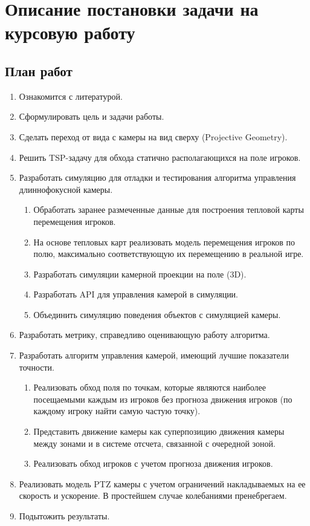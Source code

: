 \chapter{Описание постановки задачи на курсовую работу}
\label{cha:Osnovania}


\section{План работ}

\begin{enumerate}
    \item Ознакомится с литературой.
    \item Сформулировать цель и задачи работы.
    \item Сделать переход от вида с камеры на вид сверху (Projective Geometry).
    \item Решить TSP-задачу для обхода статично располагающихся на поле игроков.
    \item Разработать симуляцию для отладки и тестирования алгоритма управления длиннофокусной камеры.
    \begin{enumerate}
        \item Обработать заранее размеченные данные для построения тепловой карты перемещения игроков.
        \item На основе тепловых карт реализовать модель перемещения игроков по полю, максимально соответствующую их перемещению в реальной игре.
        \item Разработать симуляции камерной проекции на поле (3D).
        \item Разработать API для управления камерой в симуляции.
        \item Объединить симуляцию поведения объектов с симуляцией камеры.
    \end{enumerate}
    \item Разработать метрику, справедливо оценивающую работу алгоритма.
    \item Разработать алгоритм управления камерой, имеющий лучшие показатели точности.
    \begin{enumerate}
        \item Реализовать обход поля по точкам, которые являются наиболее посещаемыми каждым из игроков без прогноза движения игроков (по каждому игроку найти самую частую точку).
        \item Представить движение камеры как суперпозицию движения камеры между зонами и в системе отсчета, связанной с очередной зоной.
        \item Реализовать обход игроков с учетом прогноза движения игроков.
    \end{enumerate}
    \item Реализовать модель PTZ камеры с учетом ограничений накладываемых на ее скорость и ускорение. В простейшем случае  колебаниями пренебрегаем.
    \item Подытожить результаты.
\end{enumerate}


